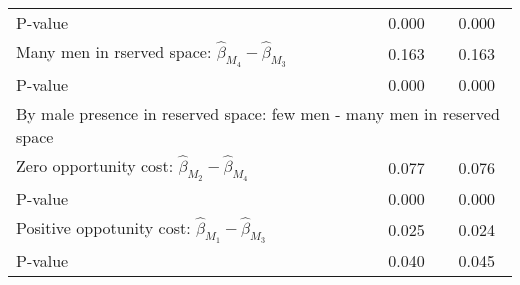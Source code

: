 \begin{tabular}{l*{2}{c}}
\quad P-value       &       0.000         &       0.000         \\
\quad Many men in rserved space: $\hat\beta_{M_4} - \hat\beta_{M_3}$ &       0.163         &       0.163         \\
\quad P-value       &       0.000         &       0.000         \\
\multicolumn{3}{l}{By male presence in reserved space: few men - many men in reserved space} \\ \quad Zero opportunity cost: $\hat\beta_{M_2} - \hat\beta_{M_4}$&       0.077         &       0.076         \\
\quad P-value       &       0.000         &       0.000         \\
\quad Positive oppotunity cost: $\hat\beta_{M_1} - \hat\beta_{M_3}$ &       0.025         &       0.024         \\
\quad P-value       &       0.040         &       0.045         \\
\hline\hline \end{tabular}
